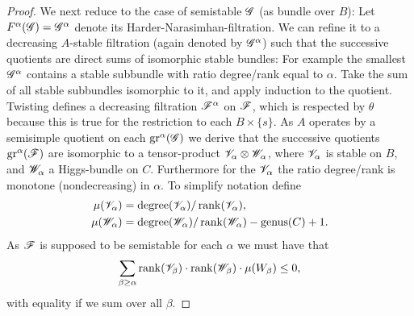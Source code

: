 \documentclass[12pt,english]{smfart}
\theoremstyle{plain} \newtheorem{innerthm}{Theorem} \newtheorem{innerlem}{Lemma} \newtheorem{innerprop}{Proposition} \newtheorem{innercor}{Corollary} \theoremstyle{definition} \newtheorem{innerdefn}{Definition} \newtheorem{innerconstr}{Construction} \theoremstyle{remark} \newtheorem*{remark}{Remark} \newtheorem*{remarks}{Remarks} \newtheorem*{applications}{Applications}
\begin{document}
\begin{proof}
We next reduce to the case of semistable $\mathscr{G}$ (as bundle over $B$): Let $F^\alpha(\mathscr{G})=\mathscr{G}^\alpha$ denote its Harder-Narasimhan-filtration. We can refine it to a decreasing $A$-stable filtration (again denoted by $\mathscr{G}^\alpha$) such that the successive quotients are direct sums of isomorphic stable bundles: For example the smallest $\mathscr{G}^\alpha$ contains a stable subbundle with ratio degree/rank equal to $\alpha$. Take the sum of all stable subbundles isomorphic to it, and apply induction to the quotient. Twisting defines a decreasing filtration $\mathscr{F}^\alpha$ on $\mathscr{F}$, which is respected by $\theta$ because this is true for the restriction to each $B\times\{s\}$. As $A$ operates by a semisimple quotient on each $\operatorname{gr}^\alpha(\mathscr{G})$ we derive that the successive quotients $\operatorname{gr}^\alpha(\mathscr{F})$ are isomorphic to a tensor-product $\mathscr{V}_\alpha\otimes\mathscr{W}_\alpha$, where $\mathscr{V}_\alpha$ is stable on $B$, and $\mathscr{W}_\alpha$ a Higgs-bundle on $C$. Furthermore for the $\mathscr{V}_\alpha$ the ratio degree/rank is monotone (nondecreasing) in $\alpha$. To simplify notation define
\begin{align*}
\mu(\mathscr{V}_\alpha)&=\operatorname{degree}(\mathscr{V}_\alpha)/\operatorname{rank}(\mathscr{V}_\alpha),\\
\mu(\mathscr{W}_\alpha)&=\operatorname{degree}(\mathscr{W}_\alpha)/\operatorname{rank}(\mathscr{W}_\alpha)
-\operatorname{genus}(C)+1.
\end{align*}
As $\mathscr{F}$ is supposed to be semistable for each $\alpha$ we must have that
\[
\sum_{\beta\ge\alpha}\operatorname{rank}(\mathscr{V}_\beta)\cdot\operatorname{rank}(\mathscr{W}_\beta)\cdot\mu(W_\beta)\le0,
\]
with equality if we sum over all $\beta$.


\end{proof}
\end{document}
